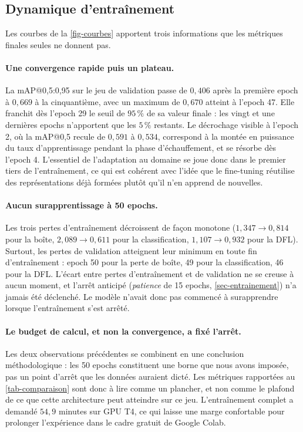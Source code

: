 \subsection{Dynamique d'entraînement}\label{sec-dynamique}

Les courbes de la \cref{fig-courbes} apportent trois informations que les
métriques finales seules ne donnent pas.

\paragraph{Une convergence rapide puis un plateau.}
La mAP@0,5:0,95 sur le jeu de validation passe de $0{,}406$ après la
première epoch à $0{,}669$ à la cinquantième, avec un maximum de
$0{,}670$ atteint à l'epoch 47. Elle franchit dès l'epoch 29 le seuil de
$95\,\%$ de sa valeur finale : les vingt et une dernières epochs
n'apportent que les $5\,\%$ restants. Le décrochage visible à l'epoch 2,
où la mAP@0,5 recule de $0{,}591$ à $0{,}534$, correspond à la montée en
puissance du taux d'apprentissage pendant la phase d'échauffement, et se
résorbe dès l'epoch 4. L'essentiel de l'adaptation au domaine se joue
donc dans le premier tiers de l'entraînement, ce qui est cohérent avec
l'idée que le fine-tuning réutilise des représentations déjà formées
plutôt qu'il n'en apprend de nouvelles.

\paragraph{Aucun surapprentissage à 50 epochs.}
Les trois pertes d'entraînement décroissent de façon monotone
($1{,}347 \rightarrow 0{,}814$ pour la boîte, $2{,}089 \rightarrow
0{,}611$ pour la classification, $1{,}107 \rightarrow 0{,}932$ pour la
DFL). Surtout, les pertes de validation atteignent leur minimum en toute
fin d'entraînement : epoch 50 pour la perte de boîte, 49 pour la
classification, 46 pour la DFL. L'écart entre pertes d'entraînement et
de validation ne se creuse à aucun moment, et l'arrêt anticipé
(\emph{patience} de 15 epochs, \cref{sec-entrainement}) n'a jamais été
déclenché. Le modèle n'avait donc pas commencé à surapprendre lorsque
l'entraînement s'est arrêté.

\paragraph{Le budget de calcul, et non la convergence, a fixé l'arrêt.}
Les deux observations précédentes se combinent en une conclusion
méthodologique : les 50 epochs constituent une borne que nous avons
imposée, pas un point d'arrêt que les données auraient dicté. Les
métriques rapportées au \cref{tab-comparaison} sont donc à lire comme un
plancher, et non comme le plafond de ce que cette architecture peut
atteindre sur ce jeu. L'entraînement complet a demandé $54{,}9$ minutes
sur GPU T4, ce qui laisse une marge confortable pour prolonger
l'expérience dans le cadre gratuit de Google Colab.
